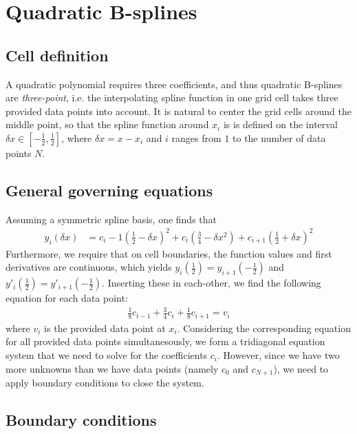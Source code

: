 \documentclass{article}
\begin{document}
\section{Quadratic B-splines}

\subsection{Cell definition}
A quadratic polynomial requires three coefficients, and thus quadratic B-splines are \emph{three-point}, i.e. the interpolating spline function in one grid cell takes three provided data points into account. It is natural to center the grid cells around the middle point, so that the spline function around $x_i$ is is defined on the interval $\delta x \in [-\frac{1}{2}, \frac{1}{2}]$, where $\delta x = x - x_i$ and $i$ ranges from $1$ to the number of data points $N$.

\subsection{General governing equations}

Assuming a symmetric spline basis, one finds that 
\begin{align}
\label{bspline-quadratic-yi}
y_i(\delta x) &= c_i-1\left(\tfrac{1}{2} - \delta x\right)^{2} + c_{i}\left(\tfrac{3}{4} - \delta x^{2}\right) + c_{i+1}\left(\tfrac{1}{2} + \delta x\right)^{2}
\end{align}
Furthermore, we require that on cell boundaries, the function values and first derivatives are continuous, which yields $y_{i}(\frac{1}{2}) = y_{i+1}(-\frac{1}{2})$ and $y'_{i}(\frac{1}{2}) = y'_{i+1}(-\frac{1}{2})$. Inserting these in each-other, we find the following equation for each data point:
\begin{align*}\frac{1}{8} c_{i-1} + \frac{3}{4} c_{i} + \frac{1}{8} c_{i+1} = v_i\end{align*}
where $v_{i}$ is the provided data point at $x_{i}$. Considering the corresponding equation for all provided data points simultanesously, we form a tridiagonal equation system that we need to solve for the coefficients $c_{i}$. However, since we have two more unknowns than we have data points (namely $c_{0}$ and $c_{N+1}$), we need to apply boundary conditions to close the system.

\subsection{Boundary conditions}
\end{document}
